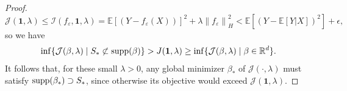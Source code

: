 \documentclass[sn-mathphys-num]{sn-jnl}%
\numberwithin{equation}{section}
\newcommand{\R}{\mathbb{R}}
\newcommand{\E}{\mathbb{E}}
\newcommand{\norm}[1]{\left\|{#1}\right\|} %
\newcommand{\eps}{\epsilon}
\newcommand{\supp}{\mathop{\rm supp}}
\theoremstyle{thmstyleone}%
\theoremstyle{thmstyletwo}%
\theoremstyle{thmstylethree}%
\begin{document}
\begin{proof}
\begin{equation*}
	\mathcal{J}(\mathbf{1}, \lambda) \le 
		\mathcal{I} (f_\varepsilon, \mathbf{1}, \lambda) = \E[(Y-f_\varepsilon (X))]^2 + \lambda \norm{f_\varepsilon}_H^2 < 
		\E[(Y - \E[Y|X])^2] + \eps,
\end{equation*}
so we have 
\begin{equation*}
	\inf\{\mathcal{J}(\beta, \lambda) \mid S_* \not \subset \supp(\beta)\}  > J(\mathbf{1}, \lambda)
		\ge \inf \{\mathcal{J}(\beta, \lambda) \mid \beta \in \R^d\}.
\end{equation*} 
It follows that, for these small $\lambda > 0$, any global minimizer $\beta_*$ of $\mathcal{J}(\cdot, \lambda)$ must satisfy $\supp(\beta_*) \supset S_*$, since otherwise its objective would exceed $\mathcal{J}(\mathbf{1}, \lambda)$.
\end{proof} 
\end{document}
